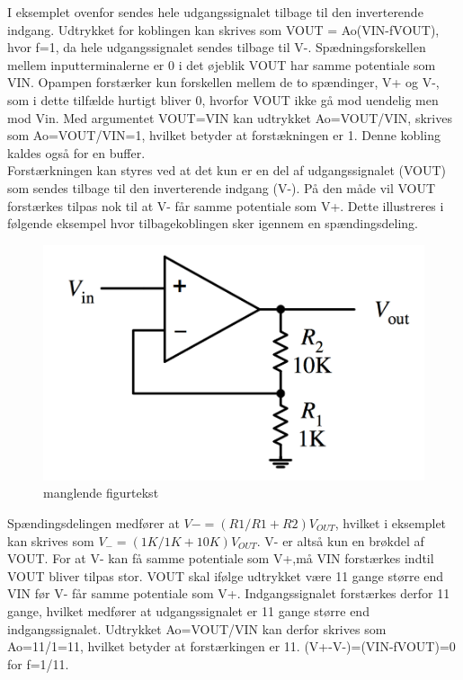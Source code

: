 \noindent
%
I eksemplet ovenfor sendes hele udgangssignalet tilbage til den inverterende indgang. Udtrykket for koblingen kan skrives som VOUT = Ao(VIN-fVOUT), hvor f=1, da hele udgangssignalet sendes tilbage til V-. Spædningsforskellen mellem inputterminalerne er 0 i det øjeblik VOUT har samme potentiale som VIN. Opampen forstærker kun forskellen mellem de to spændinger, V+ og V-, som i dette tilfælde hurtigt bliver 0, hvorfor VOUT ikke gå mod uendelig men mod Vin. Med argumentet VOUT=VIN kan udtrykket Ao=VOUT/VIN, skrives som Ao=VOUT/VIN=1, hvilket betyder at forstækningen er 1. Denne kobling kaldes også for en buffer.\\
%
Forstærkningen kan styres ved at det kun er en del af udgangssignalet (VOUT) som sendes tilbage til den inverterende indgang (V-). På den måde vil VOUT forstærkes tilpas nok til at V- får samme potentiale som V+. Dette illustreres i følgende eksempel hvor tilbagekoblingen sker igennem en spændingsdeling.
%
\begin{figure}[H]
\centering
\includegraphics[resolution=300,width=\textwidth/2]{Figure/Introduktion/TilbagekoblingSpaendingsdelingOpAmp.png}
\caption{manglende figurtekst}
\label{fig:TilbagekoblingSpaendingsdelingOpAmp}
\end{figure}
\noindent
%
Spændingsdelingen medfører at $V-=(R1/R1+R2)V_{OUT}$, hvilket i eksemplet kan skrives som $V_-=(1K/1K+10K)V_{OUT}$. V- er altså kun en brøkdel af VOUT. For at V- kan få samme potentiale som V+,må VIN forstærkes indtil VOUT bliver tilpas stor. VOUT skal ifølge udtrykket være 11 gange større end VIN før V- får samme potentiale som V+. Indgangssignalet forstærkes derfor 11 gange, hvilket medfører at udgangssignalet er 11 gange større end indgangssignalet. Udtrykket Ao=VOUT/VIN kan derfor skrives som Ao=11/1=11, hvilket betyder at forstærkingen er 11. (V+-V-)=(VIN-fVOUT)=0 for f=1/11.  
